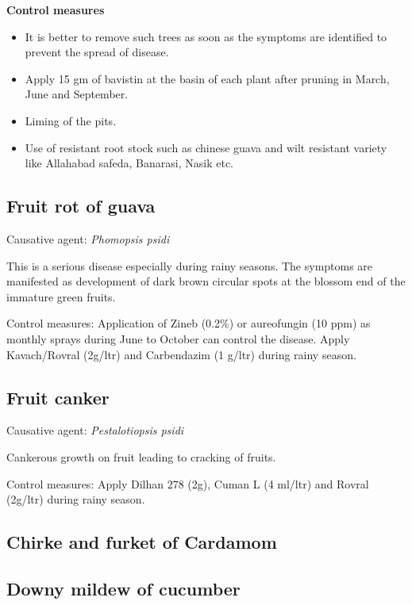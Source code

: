 \documentclass[
]{book}
\providecommand{\tightlist}{%
  \setlength{\itemsep}{0pt}\setlength{\parskip}{0pt}}
\begin{document}
\textbf{Control measures}

\begin{itemize}
\tightlist
\item
  It is better to remove such trees as soon as the symptoms are identified to prevent the spread of disease.
\item
  Apply 15 gm of bavistin at the basin of each plant after pruning in March, June and September.
\item
  Liming of the pits.
\item
  Use of resistant root stock such as chinese guava and wilt resistant variety like Allahabad safeda, Banarasi, Nasik etc.
\end{itemize}

\hypertarget{fruit-rot-of-guava}{%
\subsection{Fruit rot of guava}\label{fruit-rot-of-guava}}

Causative agent: \emph{Phomopsis psidi}

This is a serious disease especially during rainy seasons. The symptoms are manifested as development of dark brown circular spots at the blossom end of the immature green fruits.

Control measures: Application of Zineb (0.2\%) or aureofungin (10 ppm) as monthly sprays during June to October can control the disease. Apply Kavach/Rovral (2g/ltr) and Carbendazim (1 g/ltr) during rainy season.

\hypertarget{fruit-canker}{%
\subsection{Fruit canker}\label{fruit-canker}}

Causative agent: \emph{Pestalotiopsis psidi}

Cankerous growth on fruit leading to cracking of fruits.

Control measures: Apply Dilhan 278 (2g), Cuman L (4 ml/ltr) and Rovral (2g/ltr) during rainy season.

\hypertarget{chirke-and-furket-of-cardamom}{%
\subsection{Chirke and furket of Cardamom}\label{chirke-and-furket-of-cardamom}}

\hypertarget{downy-mildew-of-cucumber}{%
\subsection{Downy mildew of cucumber}\label{downy-mildew-of-cucumber}}
\end{document}
